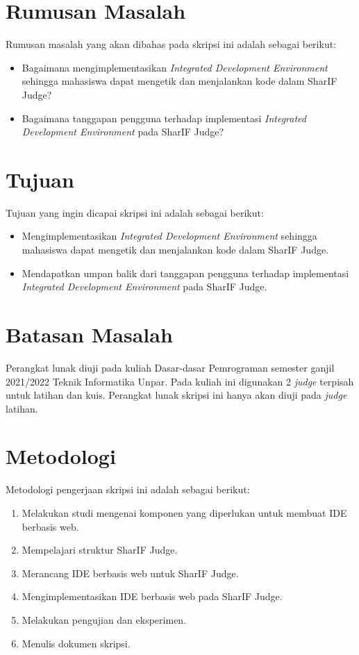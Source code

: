 \pagebreak

\section{Rumusan Masalah}
\label{sec:rumusan}
Rumusan masalah yang akan dibahas pada skripsi ini adalah sebagai berikut:
\begin{itemize}
	\item Bagaimana mengimplementasikan {\it Integrated Development Environment} sehingga mahasiswa dapat mengetik dan menjalankan kode dalam SharIF Judge?
	\item Bagaimana tanggapan pengguna terhadap implementasi {\it Integrated Development Environment} pada SharIF Judge? 
\end{itemize}


\section{Tujuan}
\label{sec:tujuan}
Tujuan yang ingin dicapai skripsi ini adalah sebagai berikut:
\begin{itemize}
	\item Mengimplementasikan {\it Integrated Development Environment} sehingga mahasiswa dapat mengetik dan menjalankan kode dalam SharIF Judge.
	\item Mendapatkan umpan balik dari tanggapan pengguna terhadap implementasi {\it Integrated Development Environment} pada SharIF Judge.
\end{itemize}

\section{Batasan Masalah}
\label{sec:batasan}
Perangkat lunak diuji pada kuliah Dasar-dasar Pemrograman semester ganjil 2021/2022 Teknik Informatika Unpar. Pada kuliah ini digunakan 2 \textit{judge} terpisah untuk latihan dan kuis.
Perangkat lunak skripsi ini hanya akan diuji pada \textit{judge} latihan.

\section{Metodologi}
\label{sec:metlit}
Metodologi pengerjaan skripsi ini adalah sebagai berikut:
\begin{enumerate}
	\item Melakukan studi mengenai komponen yang diperlukan untuk membuat IDE berbasis web.
	\item Mempelajari struktur SharIF Judge.
	\item Merancang IDE berbasis web untuk SharIF Judge.
	\item Mengimplementasikan IDE berbasis web pada SharIF Judge.
	\item Melakukan pengujian dan eksperimen.
	\item Menulis dokumen skripsi.
\end{enumerate}

